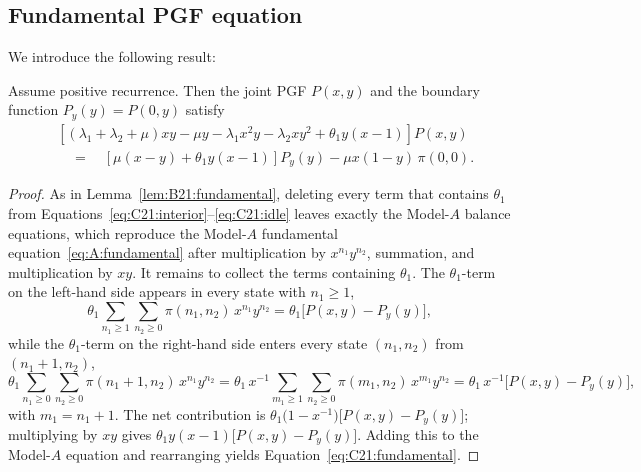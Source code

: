 \subsection{Fundamental PGF equation}
We introduce the following result:
\begin{lemma}\label{lem:C21:fundamental}
    Assume positive recurrence. Then the joint PGF $P(x,y)$ and the boundary function $P_y(y)=P(0,y)$ satisfy
    \begin{equation}
        \begin{split}
            &\left[(\lambda_1+\lambda_2+\mu)xy - \mu y - \lambda_1 x^2y - \lambda_2 xy^2
                   + \theta_1 y(x-1)\right]P(x,y) \\
            &\quad=\quad \left[\mu(x-y) + \theta_1 y(x-1)\right]P_y(y)
                   - \mu x(1-y)\,\pi(0,0).
        \end{split}
        \label{eq:C21:fundamental}
    \end{equation}
\end{lemma}

\begin{proof}
    As in Lemma~\ref{lem:B21:fundamental}, deleting every term that contains $\theta_1$ from Equations~\eqref{eq:C21:interior}--\eqref{eq:C21:idle} leaves exactly the Model-$A$ balance equations, which reproduce the Model-$A$ fundamental equation~\eqref{eq:A:fundamental} after multiplication by $x^{n_1}y^{n_2}$, summation, and multiplication by $xy$. It remains to collect the terms containing $\theta_1$. The $\theta_1$-term on the left-hand side appears in every state with $n_1\geq1$,
    \begin{equation*}
        \theta_1\sum_{n_1\ge1}\sum_{n_2\ge0}\pi(n_1,n_2)\,x^{n_1}y^{n_2}
        = \theta_1\bigl[P(x,y)-P_y(y)\bigr],
    \end{equation*}
    while the $\theta_1$-term on the right-hand side enters every state $(n_1,n_2)$ from $(n_1+1,n_2)$,
    \begin{equation*}
        \theta_1\sum_{n_1\ge0}\sum_{n_2\ge0}\pi(n_1+1,n_2)\,x^{n_1}y^{n_2}
        = \theta_1\,x^{-1}\sum_{m_1\ge1}\sum_{n_2\ge0}\pi(m_1,n_2)\,x^{m_1}y^{n_2}
        = \theta_1\,x^{-1}\bigl[P(x,y)-P_y(y)\bigr],
    \end{equation*}
    with $m_1=n_1+1$. The net contribution is
    $\theta_1\bigl(1-x^{-1}\bigr)\bigl[P(x,y)-P_y(y)\bigr]$; multiplying by $xy$ gives $\theta_1 y(x-1)\bigl[P(x,y)-P_y(y)\bigr]$. Adding this to the Model-$A$ equation and rearranging yields Equation~\eqref{eq:C21:fundamental}.
\end{proof}

